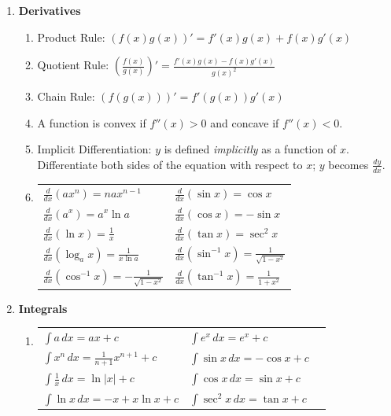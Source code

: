 \documentclass[10pt]{article}
\begin{document}
\begin{multicols}{2}
\begin{enumerate}
    \item \textbf{Derivatives} 
    \begin{enumerate}
        \item Product Rule: $(f(x)g(x))' = f'(x)g(x) + f(x)g'(x)$
        \item Quotient Rule: $ \left( \frac{f(x)}{g(x)} \right)' = \frac{f'(x)g(x) - f(x)g'(x)}{g(x)^2}$
        \item Chain Rule: $ (f (g (x)))' = f'(g(x))g'(x)$
        \item A function is convex if $f''(x) > 0$ and concave if $f''(x) < 0$.
        \item Implicit Differentiation: $y$ is defined \textit{implicitly} as a function of $x$. Differentiate both sides of the equation with respect to $x$; $y$ becomes $\frac{dy}{dx}$.
        \item
        \begin{tabular}[t]{ll}
        $\frac{d}{dx}(ax^n) = nax^{n-1}$                        & $\frac{d}{dx}(\sin{x}) =  \cos{x}$   \\[6pt]
        $\frac{d}{dx}(a^x) = a^x \ln{a}$                        & $\frac{d}{dx}(\cos{x}) = -\sin{x}$   \\[6pt]
        $\frac{d}{dx}(\ln{x}) = \frac{1}{x}$                    & $\frac{d}{dx}(\tan{x}) =  \sec^2{x}$ \\[6pt]
        $\frac{d}{dx}(\log_a{x}) = \frac{1}{x\ln{a}}$           & $\frac{d}{dx}(\sin^{-1}{x}) = \frac{1}{\sqrt{1-x^2}}$ \\[6pt]
        $\frac{d}{dx}(\cos^{-1}{x}) = -\frac{1}{\sqrt{1-x^2}}$  & $\frac{d}{dx}(\tan^{-1}{x}) = \frac{1}{1+x^2}$ \\[6pt]
        \end{tabular}

    \end{enumerate}
    \item \textbf{Integrals}
    \begin{enumerate}
    \item 
    \begin{tabular}[t]{lll}
    $\int a \, dx = ax + c$      					& $\int e^x \, dx = e^x + c$            \\[6pt]
    $\int x^n \, dx = \frac{1}{n+1}x^{n+1} + c$     & $\int \sin{x} \, dx = -\cos{x} + c$   \\[6pt]     
    $\int \frac{1}{x} \, dx = \ln{|x|} + c$      	& $\int \cos{x} \, dx = \sin{x} + c$    \\[6pt]     
    $\int \ln{x} \, dx = -x + x\ln{x} + c$          & $\int \sec^2{x} \, dx = \tan{x} + c$  \\[6pt]
    \end{tabular}
    

\end{enumerate}
\end{enumerate}
\end{multicols}
\end{document}

